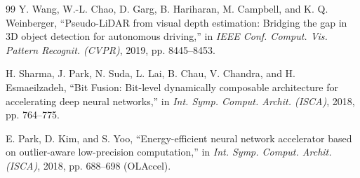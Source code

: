 \documentclass[journal]{IEEEtran}
\begin{document}
\begin{thebibliography}{99}
Y. Wang, W.-L. Chao, D. Garg, B. Hariharan, M. Campbell, and K. Q. Weinberger, ``Pseudo-LiDAR from visual depth estimation: Bridging the gap in 3D object detection for autonomous driving,'' in \textit{IEEE Conf. Comput. Vis. Pattern Recognit. (CVPR)}, 2019, pp. 8445--8453.

H. Sharma, J. Park, N. Suda, L. Lai, B. Chau, V. Chandra, and H. Esmaeilzadeh, ``Bit Fusion: Bit-level dynamically composable architecture for accelerating deep neural networks,'' in \textit{Int. Symp. Comput. Archit. (ISCA)}, 2018, pp. 764--775.

E. Park, D. Kim, and S. Yoo, ``Energy-efficient neural network accelerator based on outlier-aware low-precision computation,'' in \textit{Int. Symp. Comput. Archit. (ISCA)}, 2018, pp. 688--698 (OLAccel).

\end{thebibliography}
\end{document}
